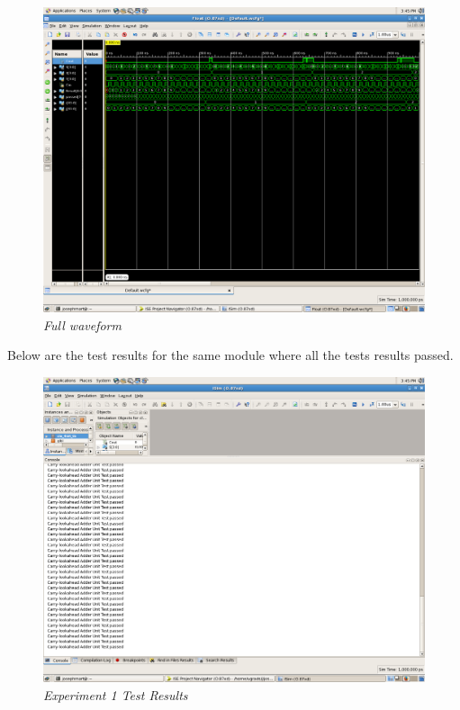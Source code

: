 \documentclass[a4paper,12pt]{article}
\begin{document}
\begin{figure}[h]
  \begin{center}
    \includegraphics[scale=.2]{exp1_full_waveform.png}
    \caption{\textit{Full waveform}}
  \end{center}
\end{figure}

Below are the test results for the same module where all the tests results passed.

\begin{figure}[h]
  \begin{center}
    \includegraphics[scale=.15]{exp1_test_results.png}
    \caption{\textit{Experiment 1 Test Results}}
  \end{center}
\end{figure}
\end{document}
